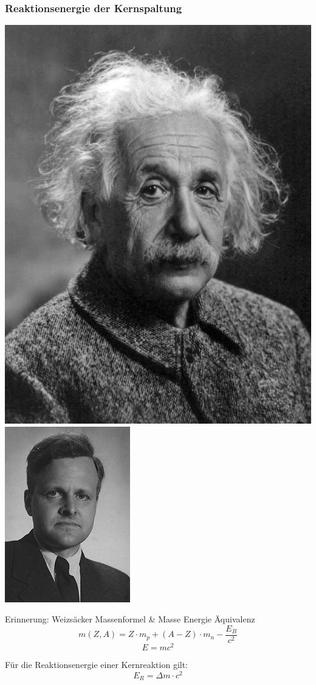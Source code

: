 \documentclass{beamer}[9pt]
\begin{document}
\begin{frame}
\frametitle{Reaktionsenergie der Kernspaltung}
\vspace{-1.8cm}
\hspace*{7.5cm}\includegraphics[scale=.1]{Albert_Einstein_Head.jpg}\includegraphics[scale=.208]{Weizsaecker}
\begin{block}{Erinnerung: Weizsäcker Massenformel \& Masse Energie Äquivalenz}
\[
m(Z,A) = Z \cdot m_p + (A-Z)\cdot m_n - \frac{E_B}{c^2}
\]
\[
E = mc^2
\]
\end{block}

Für die Reaktionsenergie einer Kernreaktion gilt:
\[
E_R = \Delta m \cdot c^2
\]

\end{frame}
\end{document}
